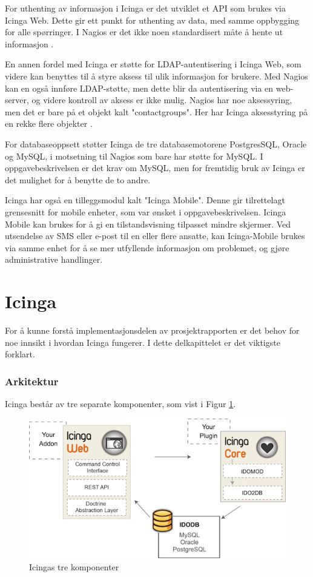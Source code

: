 For uthenting av informasjon i Icinga er det utviklet et API som brukes via Icinga Web. Dette gir ett punkt for uthenting av data, med samme oppbygging for alle spørringer. I Nagios er det ikke noen standardisert måte å hente ut informasjon \cite{icingaapi}. 

En annen fordel med Icinga er støtte for LDAP-autentisering i Icinga Web, som videre kan benyttes til å styre aksess til ulik informasjon for brukere. Med Nagios kan en også innføre LDAP-støtte, men dette blir da autentisering via en web-server, og videre kontroll av aksess er ikke mulig. Nagios har noe aksessyring, men det er bare på et objekt kalt "contactgroups". Her har Icinga aksesstyring på en rekke flere objekter \cite{icingaweb}.

For databaseoppsett støtter Icinga de tre databasemotorene PostgresSQL, Oracle og MySQL, i motsetning til Nagios som bare har støtte for MySQL. I oppgavebeskrivelsen er det krav om MySQL, men for fremtidig bruk av Icinga er det mulighet for å benytte de to andre.

Icinga har også en tilleggsmodul kalt "Icinga Mobile". Denne gir tilrettelagt grensesnitt for mobile enheter, som var ønsket i oppgavebeskrivelsen. Icinga Mobile kan brukes for å gi en tilstandsvisning tilpasset mindre skjermer. Ved utsendelse av SMS eller e-post til en eller flere ansatte, kan Icinga-Mobile brukes via samme enhet for å se mer utfyllende informasjon om problemet, og gjøre administrative handlinger.

\section{Icinga}
For å kunne forstå implementasjonsdelen av prosjektrapporten er det behov for noe innsikt i hvordan Icinga fungerer. I dette delkapittelet er det viktigste forklart.
\subsubsection{Arkitektur}
Icinga består av tre separate komponenter, som vist i Figur \ref{icingacomponents}.

\begin{figure}[H]
    \centering
    \includegraphics[scale=1.2]{img/icinga_architecture}
    \caption{Icingas tre komponenter}
    \label{icingacomponents}
\end{figure}


